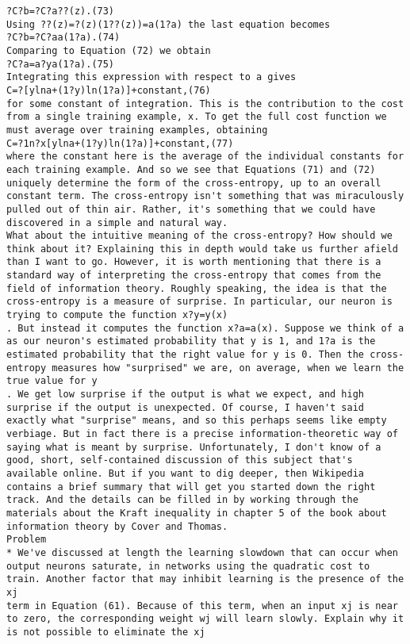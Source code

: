 \begin{lstlisting}
?C?b=?C?a??(z).(73)
Using ??(z)=?(z)(1??(z))=a(1?a) the last equation becomes 
?C?b=?C?aa(1?a).(74)
Comparing to Equation (72) we obtain 
?C?a=a?ya(1?a).(75)
Integrating this expression with respect to a gives 
C=?[ylna+(1?y)ln(1?a)]+constant,(76)
for some constant of integration. This is the contribution to the cost from a single training example, x. To get the full cost function we must average over training examples, obtaining 
C=?1n?x[ylna+(1?y)ln(1?a)]+constant,(77)
where the constant here is the average of the individual constants for each training example. And so we see that Equations (71) and (72) uniquely determine the form of the cross-entropy, up to an overall constant term. The cross-entropy isn't something that was miraculously pulled out of thin air. Rather, it's something that we could have discovered in a simple and natural way.
What about the intuitive meaning of the cross-entropy? How should we think about it? Explaining this in depth would take us further afield than I want to go. However, it is worth mentioning that there is a standard way of interpreting the cross-entropy that comes from the field of information theory. Roughly speaking, the idea is that the cross-entropy is a measure of surprise. In particular, our neuron is trying to compute the function x?y=y(x)
. But instead it computes the function x?a=a(x). Suppose we think of a as our neuron's estimated probability that y is 1, and 1?a is the estimated probability that the right value for y is 0. Then the cross-entropy measures how "surprised" we are, on average, when we learn the true value for y
. We get low surprise if the output is what we expect, and high surprise if the output is unexpected. Of course, I haven't said exactly what "surprise" means, and so this perhaps seems like empty verbiage. But in fact there is a precise information-theoretic way of saying what is meant by surprise. Unfortunately, I don't know of a good, short, self-contained discussion of this subject that's available online. But if you want to dig deeper, then Wikipedia contains a brief summary that will get you started down the right track. And the details can be filled in by working through the materials about the Kraft inequality in chapter 5 of the book about information theory by Cover and Thomas.
Problem
* We've discussed at length the learning slowdown that can occur when output neurons saturate, in networks using the quadratic cost to train. Another factor that may inhibit learning is the presence of the xj
term in Equation (61). Because of this term, when an input xj is near to zero, the corresponding weight wj will learn slowly. Explain why it is not possible to eliminate the xj

\end{lstlisting}
